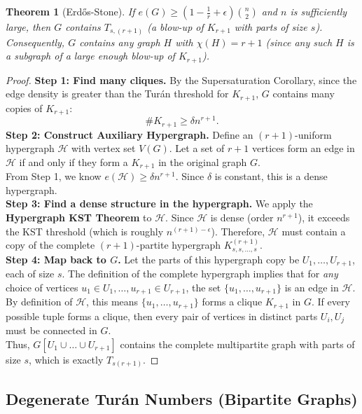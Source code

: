 \documentclass[a4paper]{article}
\newtheorem{thm}{Theorem}[section]
\begin{document}
\begin{thm}[Erd\H{o}s-Stone]
    If $e(G) \geq \left( 1-\frac{1}{r}+\epsilon \right)\binom{n}{2}$ and $n$ is sufficiently large, then $G$ contains $T_{s,(r+1)}$ (a blow-up of $K_{r+1}$ with parts of size $s$).\\
    Consequently, $G$ contains any graph $H$ with $\chi(H) = r+1$ (since any such $H$ is a subgraph of a large enough blow-up of $K_{r+1}$).
\end{thm}
\begin{proof}
        \textbf{Step 1: Find many cliques.}
        By the Supersaturation Corollary, since the edge density is greater than the Turán threshold for $K_{r+1}$, $G$ contains many copies of $K_{r+1}$:
        \[
        \# K_{r+1} \geq \delta n^{r+1}.
        \]
        \textbf{Step 2: Construct Auxiliary Hypergraph.}
        Define an $(r+1)$-uniform hypergraph $\mathcal{H}$ with vertex set $V(G)$. Let a set of $r+1$ vertices form an edge in $\mathcal{H}$ if and only if they form a $K_{r+1}$ in the original graph $G$.\\
        From Step 1, we know $e(\mathcal{H}) \geq \delta n^{r+1}$. Since $\delta$ is constant, this is a dense hypergraph.\\
        \textbf{Step 3: Find a dense structure in the hypergraph.}
        We apply the \textbf{Hypergraph KST Theorem} to $\mathcal{H}$. Since $\mathcal{H}$ is dense (order $n^{r+1}$), it exceeds the KST threshold (which is roughly $n^{(r+1) - \epsilon}$).
        Therefore, $\mathcal{H}$ must contain a copy of the complete $(r+1)$-partite hypergraph $K_{s,s,\dots,s}^{(r+1)}$.\\
        \textbf{Step 4: Map back to $G$.}
        Let the parts of this hypergraph copy be $U_1, \dots, U_{r+1}$, each of size $s$. The definition of the complete hypergraph implies that for \emph{any} choice of vertices $u_1 \in U_1, \dots, u_{r+1} \in U_{r+1}$, the set $\{u_1, \dots, u_{r+1}\}$ is an edge in $\mathcal{H}$.\\
        By definition of $\mathcal{H}$, this means $\{u_1, \dots, u_{r+1}\}$ forms a clique $K_{r+1}$ in $G$.
        If every possible tuple forms a clique, then every pair of vertices in distinct parts $U_i, U_j$ must be connected in $G$.\\
        Thus, $G[U_1 \cup \dots \cup U_{r+1}]$ contains the complete multipartite graph with parts of size $s$, which is exactly $T_{s(r+1)}$.
\end{proof}

\subsection{Degenerate Turán Numbers (Bipartite Graphs)}
\end{document}
